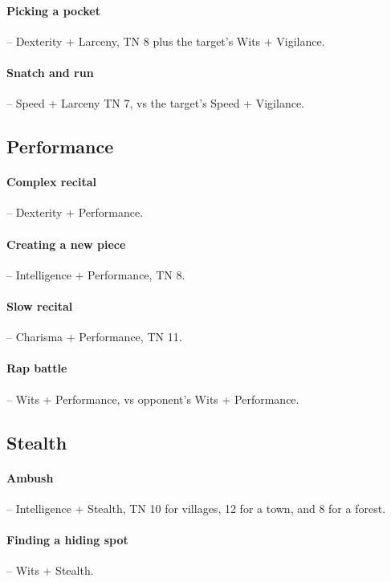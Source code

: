 \begin{multicols}{2}
\paragraph{Picking a pocket} -- Dexterity + Larceny, TN 8 plus the target's Wits + Vigilance.

\paragraph{Snatch and run} -- Speed + Larceny TN 7, vs the target's Speed + Vigilance.

\subsection{Performance}

\paragraph{Complex recital} -- Dexterity + Performance.

\paragraph{Creating a new piece} -- Intelligence + Performance, TN 8.

\paragraph{Slow recital} -- Charisma + Performance, TN 11.

\paragraph{Rap battle} -- Wits + Performance, vs opponent's Wits + Performance.

\subsection{Stealth}

\paragraph{Ambush} -- Intelligence + Stealth, TN 10 for villages, 12 for a town, and 8 for a forest.

\paragraph{Finding a hiding spot} -- Wits + Stealth.


\end{multicols}
